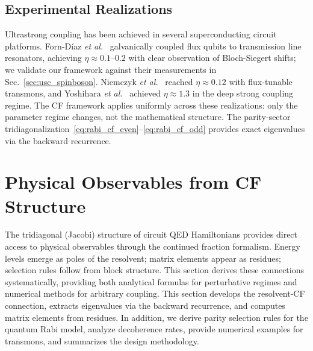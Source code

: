 \documentclass[reprint, floatfix, superscriptaddress, amsmath, amssymb, longbibliography]{revtex4-2}
\begin{document}
\subsection{Experimental Realizations}
\label{sec:experimental}

Ultrastrong coupling has been achieved in several superconducting circuit platforms. Forn-D\'iaz \textit{et al.}~\cite{FornDiaz2017} galvanically coupled flux qubits to transmission line resonators, achieving $\eta \approx 0.1$--$0.2$ with clear observation of Bloch-Siegert shifts; we validate our framework against their measurements in Sec.~\ref{sec:usc_spinboson}. Niemczyk \textit{et al.}~\cite{Niemczyk2010} reached $\eta \approx 0.12$ with flux-tunable transmons, and Yoshihara \textit{et al.}~\cite{Yoshihara2017} achieved $\eta \approx 1.3$ in the deep strong coupling regime. The CF framework applies uniformly across these realizations: only the parameter regime changes, not the mathematical structure. The parity-sector tridiagonalization~\eqref{eq:rabi_cf_even}--\eqref{eq:rabi_cf_odd} provides exact eigenvalues via the backward recurrence.



\section{Physical Observables from CF Structure}
\label{sec:observables}

The tridiagonal (Jacobi) structure of circuit QED Hamiltonians provides direct access to physical observables through the continued fraction formalism. Energy levels emerge as poles of the resolvent; matrix elements appear as residues; selection rules follow from block structure. This section derives these connections systematically, providing both analytical formulas for perturbative regimes and numerical methods for arbitrary coupling. This section develops the resolvent-CF connection, extracts eigenvalues via the backward recurrence, and computes matrix elements from residues. In addition, we derive parity selection rules for the quantum Rabi model, analyze decoherence rates, provide numerical examples for transmons, and summarizes the design methodology.
\end{document}
